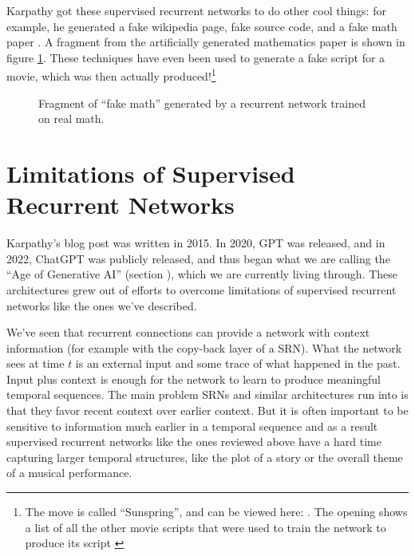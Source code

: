 Karpathy got these supervised recurrent networks to do other cool things:  for example, he generated a fake wikipedia page, fake source code, and a fake math paper \cite{karpathy2015unreasonable}. A fragment from the artificially generated mathematics paper is shown in figure \ref{fakeMath}. These techniques have even been used to generate a fake script for a movie, which was then actually produced!\footnote{The move is called ``Sunspring'', and can be viewed here: . The opening shows a list of all the other movie scripts that were used to train the network to produce its script \cite{newitz2016movie}}

\begin{figure}[h]
\centering
{}
\caption[From Karpathy, 2015 \cite{karpathy2015unreasonable}.]{Fragment of ``fake math'' generated by a recurrent network trained on real math.}
\label{fakeMath}
\end{figure}

\section{Limitations of Supervised Recurrent Networks}\label{supervisedRecurrentLimitations}

Karpathy's blog post was written in 2015. In 2020, GPT was released, and in 2022, ChatGPT was publicly released, and thus began what we are calling the ``Age of Generative AI'' (section ), which we are currently living through. These architectures grew out of efforts to overcome limitations of supervised recurrent networks like the ones we've described.

We've seen that recurrent connections can provide a network with context information (for example with the copy-back layer of a SRN). What the network sees at time $t$ is an external input and some trace of what happened in the past. Input plus context is enough for the network to learn to produce meaningful temporal sequences. The main problem SRNs and similar architectures run into is that they favor recent context over earlier context. But  it is often important to be sensitive to information much earlier in a temporal sequence and as a result supervised recurrent networks like the ones reviewed above have a hard time capturing larger temporal structures, like the plot of a story or the overall theme of a musical performance. 


